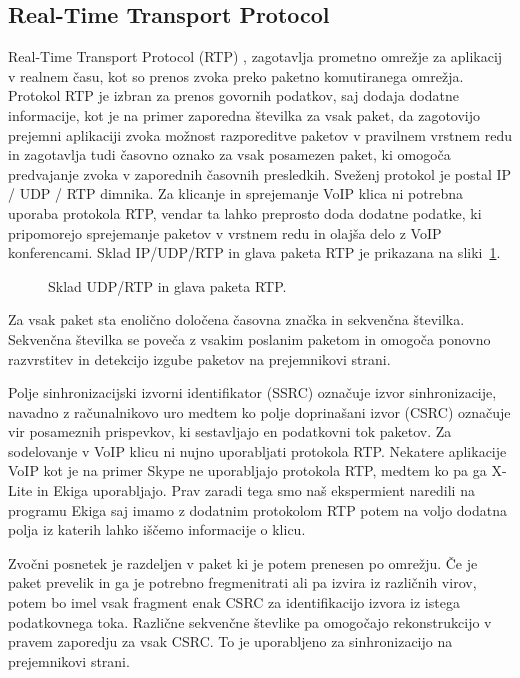 \documentclass{acm_proc_article-sp}
\begin{document}
\subsection{Real-Time Transport Protocol}

Real-Time Transport Protocol (RTP) , zagotavlja prometno omrežje za aplikacij v realnem času, kot so prenos zvoka preko paketno komutiranega omrežja. Protokol RTP je izbran za prenos govornih podatkov, saj dodaja dodatne informacije, kot je na primer zaporedna številka za vsak paket, da zagotovijo prejemni aplikaciji zvoka možnost razporeditve paketov v pravilnem vrstnem redu in zagotavlja tudi časovno oznako za vsak posamezen paket, ki omogoča predvajanje zvoka v zaporednih časovnih presledkih. Sveženj protokol je postal IP / UDP / RTP dimnika. Za klicanje in sprejemanje VoIP klica ni potrebna uporaba protokola RTP, vendar ta lahko preprosto doda dodatne podatke, ki pripomorejo sprejemanje paketov v vrstnem redu in olajša delo z VoIP konferencami. Sklad IP/UDP/RTP in glava paketa RTP je prikazana na sliki~\ref{fig:ip-udp-rtp}.

\begin{figure}
\centering
{} %
\caption{Sklad UDP/RTP in glava paketa RTP.}
\label{fig:ip-udp-rtp}
\end{figure}

Za vsak paket sta enolično določena časovna značka in sekv\-enčna številka. Sekvenčna številka se poveča z vsakim poslanim paketom in omogoča ponovno razvrstitev in detekcijo izgube paketov na prejemnikovi strani.

Polje sinhronizacijski izvorni identifikator (SSRC) označuje izvor sinhronizacije, navadno z računalnikovo uro medtem ko polje doprinašani izvor (CSRC) označuje vir posameznih prispevkov, ki sestavljajo en podatkovni tok paketov. Za sodelovanje v VoIP klicu ni nujno uporabljati protokola RTP. Nekatere aplikacije VoIP kot je na primer Skype ne uporabljajo protokola RTP, medtem ko pa ga X-Lite in Ekiga uporabljajo. Prav zaradi tega smo naš ekspermient naredili na programu Ekiga saj imamo z dodatnim protokolom RTP potem na voljo dodatna polja iz katerih lahko iščemo informacije o klicu.

Zvočni posnetek je razdeljen v paket ki je potem prenesen po omrežju. Če je paket prevelik in ga je potrebno fregmenitrati ali pa izvira iz različnih virov, potem bo imel vsak fragment enak CSRC za identifikacijo izvora iz istega podatkovnega toka. Različne sekvenčne števlike pa omogočajo rekonstrukcijo v pravem zaporedju za vsak CSRC. To je uporabljeno za sinhronizacijo na prejemnikovi strani.
\end{document}
